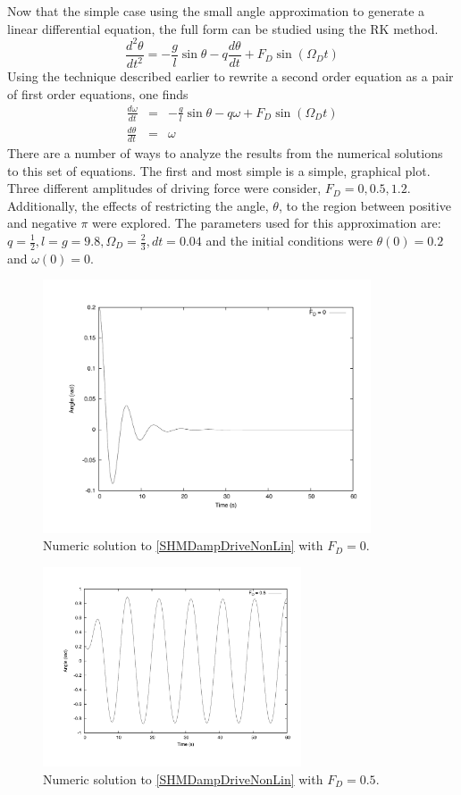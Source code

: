 \documentclass[12pt]{article}
\begin{document}
Now that the simple case using the small angle approximation to generate a linear differential equation, the full form can be studied using the RK method.
\begin{equation}
\label{SHMDampDriveNonLin}
\frac{d^2\theta}{dt^2} = -\frac{g}{l}\sin{\theta}-q \frac{d \theta}{dt} + F_D \sin{(\Omega_D t)}
\end{equation}
Using the technique described earlier to rewrite a second order equation as a pair of first order equations, one finds
\begin{eqnarray}
\frac{d\omega}{dt} &=& -\frac{g}{l}\sin{\theta}-q \omega + F_D \sin{(\Omega_D t)}\\
\frac{d\theta}{dt} &=& \omega \nonumber
\end{eqnarray}
There are a number of ways to analyze the results from the numerical solutions to this set of equations.  The first and most simple is a simple, graphical plot.  Three different amplitudes of driving force were consider, $F_D = 0, 0.5, 1.2$.  Additionally, the effects of restricting the angle, $\theta$, to the region between positive and negative $\pi$ were explored.  The parameters used for this approximation are:  $q=\frac{1}{2}, l=g=9.8, \Omega_D=\frac{2}{3}, dt=0.04$ and the initial conditions were $\theta(0)=0.2$ and $\omega(0)=0$.
\begin{figure}[!h]
\centering
\includegraphics[width =120 mm, height = 75mm]{Fig_3_6_0_res.pdf}
\caption{Numeric solution to \eqref{SHMDampDriveNonLin} with $F_D=0$.}
\label{fig:3_6_0}
\end{figure}
\begin{figure}[!h]
\centering
\includegraphics[width =110 mm, height = 59mm]{Fig_3_6_5_res.pdf}
\caption{Numeric solution to \eqref{SHMDampDriveNonLin} with $F_D=0.5$.}
\label{fig:3_6_5}
\end{figure}
\end{document}
